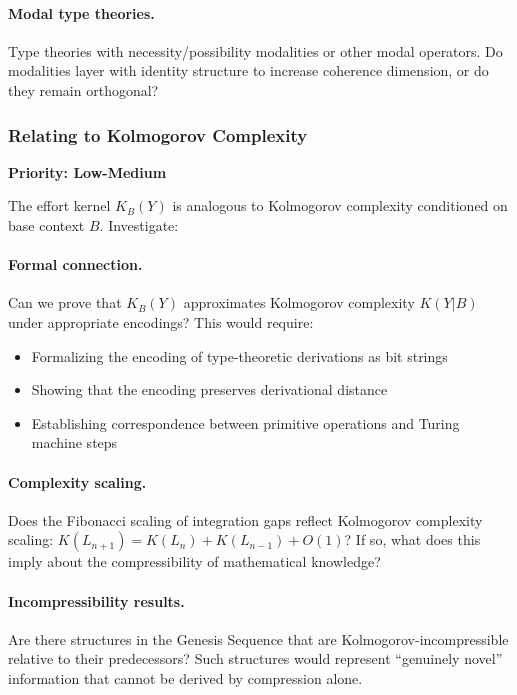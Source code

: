 \documentclass[11pt]{article}
\theoremstyle{definition}
\theoremstyle{remark}
\begin{document}
\paragraph{Modal type theories.}
Type theories with necessity/possibility modalities or other modal operators. Do modalities layer
with identity structure to increase coherence dimension, or do they remain orthogonal?

\subsubsection{Relating to Kolmogorov Complexity}

\textbf{Priority: Low-Medium}

The effort kernel $K_B(Y)$ is analogous to Kolmogorov complexity conditioned on base context $B$.
Investigate:

\paragraph{Formal connection.}
Can we prove that $K_B(Y)$ approximates Kolmogorov complexity $K(Y|B)$ under appropriate encodings?
This would require:
\begin{itemize}
\item Formalizing the encoding of type-theoretic derivations as bit strings
\item Showing that the encoding preserves derivational distance
\item Establishing correspondence between primitive operations and Turing machine steps
\end{itemize}

\paragraph{Complexity scaling.}
Does the Fibonacci scaling of integration gaps reflect Kolmogorov complexity scaling:
$K(L_{n+1}) = K(L_n) + K(L_{n-1}) + O(1)$? If so, what does this imply about the compressibility of
mathematical knowledge?

\paragraph{Incompressibility results.}
Are there structures in the Genesis Sequence that are Kolmogorov-incompressible relative to their
predecessors? Such structures would represent ``genuinely novel'' information that cannot be derived
by compression alone.
\end{document}
